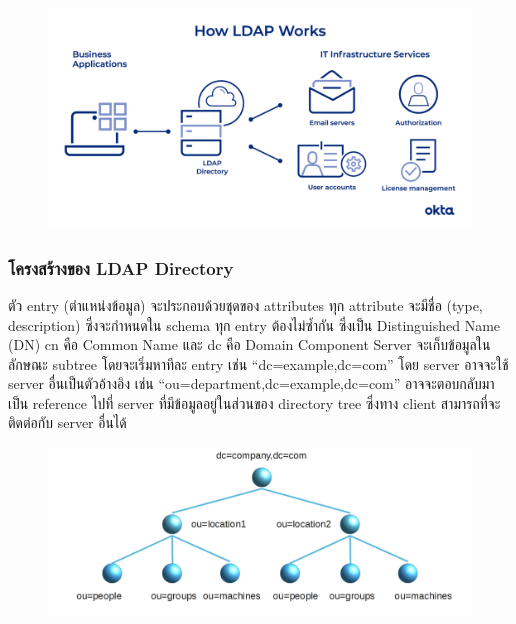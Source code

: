 \begin{figure}[!thb]
	\captionsetup{justification=centering}
	\centering
	\includegraphics[width=6in]{figures/ldap.png}
	\label{fig:ldap}
\end{figure}
\newpage

\subsubsection{โครงสร้างของ LDAP Directory}
ตัว entry (ตำแหน่งข้อมูล) จะประกอบด้วยชุดของ attributes ทุก attribute จะมีชื่อ (type, description) ซึ่งจะกำหนดใน schema ทุก entry ต้องไม่ซ้ำกัน ซึ่งเป็น Distinguished Name (DN) cn คือ Common Name และ dc คือ Domain Component Server จะเก็บข้อมูลในลักษณะ subtree โดยจะเริ่มหาทีละ entry เช่น “dc=example,dc=com” โดย server อาจจะใช้ server อื่นเป็นตัวอ้างอิง เช่น “ou=department,dc=example,dc=com” อาจจะตอบกลับมาเป็น reference ไปที่ server ที่มีข้อมูลอยู่ในส่วนของ directory tree ซึ่งทาง client สามารถที่จะติดต่อกับ server อื่นได้
\begin{figure}[!thb]
    \captionsetup{justification=centering}
    \centering
    \includegraphics[width=5in]{figures/ldap-structure.png}
    \label{fig:ldap-structure}
\end{figure}
\newpage

